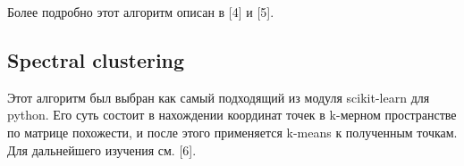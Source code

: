 Более подробно этот алгоритм описан в [4] и [5].

\subsection{Spectral clustering}
Этот алгоритм был выбран как самый подходящий из модуля scikit-learn для python. Его суть состоит в нахождении координат точек в k-мерном пространстве по матрице похожести, и после этого применяется k-means к полученным точкам. Для дальнейшего изучения см. [6].